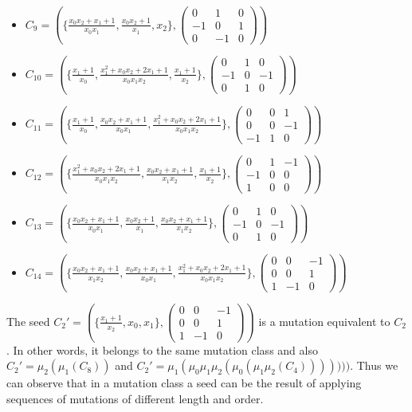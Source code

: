 \documentclass[12pt,a4paper]{article}
\begin{document}
\begin{itemize}
    \item[] $C_9 = \left( \{\frac{x_0x_2+x_1+1}{x_0x_1}, \frac{x_0x_2+1}{x_1}, x_2\}, \begin{pmatrix} 0 & 1 & 0 \\ -1 & 0 & 1 \\ 0 & -1 & 0 \end{pmatrix} \right)$
    \item[] $C_{10} = \left( \{\frac{x_1+1}{x_0}, \frac{x_1^2+x_0x_2+2x_1+1}{x_0x_1x_2}, \frac{x_1+1}{x_2}\}, \begin{pmatrix} 0 & 1 & 0 \\ -1 & 0 & -1 \\ 0 & 1 & 0 \end{pmatrix} \right)$
    \item[] $C_{11} = \left( \{\frac{x_1+1}{x_0}, \frac{x_0x_2+x_1+1}{x_0x_1}, \frac{x_1^2+x_0x_2+2x_1+1}{x_0x_1x_2}\}, \begin{pmatrix} 0 & 0 & 1 \\ 0 & 0 & -1 \\ -1 & 1 & 0 \end{pmatrix} \right)$
    \item[] $C_{12} = \left( \{\frac{x_1^2+x_0x_2+2x_1+1}{x_0x_1x_2}, \frac{x_0x_2+x_1+1}{x_1x_2}, \frac{x_1+1}{x_2}\}, \begin{pmatrix} 0 & 1 & -1 \\ -1 & 0 & 0 \\ 1 & 0 & 0 \end{pmatrix} \right)$
    \item[] $C_{13} = \left( \{\frac{x_0x_2+x_1+1}{x_0x_1}, \frac{x_0x_2+1}{x_1}, \frac{x_0x_2+x_1+1}{x_1x_2}\}, \begin{pmatrix} 0 & 1 & 0 \\ -1 & 0 & -1 \\ 0 & 1 & 0 \end{pmatrix} \right)$
    \item[] $C_{14} = \left( \{\frac{x_0x_2+x_1+1}{x_1x_2}, \frac{x_0x_2+x_1+1}{x_0x_1}, \frac{x_1^2+x_0x_2+2x_1+1}{x_0x_1x_2}\}, \begin{pmatrix} 0 & 0 & -1 \\ 0 & 0 & 1 \\ 1 & -1 & 0 \end{pmatrix} \right)$
\end{itemize}



The seed $C_2' = \left( \{ \frac{x_1+1}{x_2},x_0, x_1\}, \begin{pmatrix} 0 & 0& -1 \\ 0 & 0 & 1 \\ 1& -1 & 0 \end{pmatrix} \right)$ is a mutation equivalent to $C_2$. In other words, it belongs to the same mutation class and  also $C_2'=\mu_2(\mu_1(C_8))$ and  $C_2'=\mu_1(\mu_0\mu_1\mu_2(\mu_0(\mu_1\mu_2(C_4)))))))$. Thus we can observe that in a mutation class a seed can be the result of applying sequences of mutations of different length and order.
\end{document}
